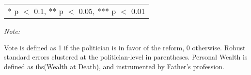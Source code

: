 \begin{table}[!h]
{\begin{threeparttable}
\begin{tabular}[t]{lcccccc}
\bottomrule
\multicolumn{7}{l}{\rule{0pt}{1em}* p $<$ 0.1, ** p $<$ 0.05, *** p $<$ 0.01}\\
\end{tabular}
\begin{tablenotes}[para]
\item \textit{Note: } 
\item Vote is defined as 1 if the politician is in favor of the reform, 0 otherwise. Robust standard errors clustered at the politician-level in parentheses. Personal Wealth is defined as ihs(Wealth at Death), and instrumented by Father's profession.
\end{tablenotes}
\end{threeparttable}}
\end{table}
